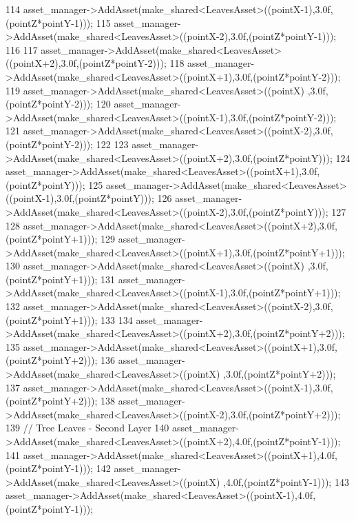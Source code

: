 \begin{DoxyCode}
114             asset\_manager->AddAsset(make\_shared<LeavesAsset>((pointX-1),3.0f,(pointZ*pointY-1)));
115             asset\_manager->AddAsset(make\_shared<LeavesAsset>((pointX-2),3.0f,(pointZ*pointY-1)));
116 
117             asset\_manager->AddAsset(make\_shared<LeavesAsset>((pointX+2),3.0f,(pointZ*pointY-2)));
118             asset\_manager->AddAsset(make\_shared<LeavesAsset>((pointX+1),3.0f,(pointZ*pointY-2)));
119             asset\_manager->AddAsset(make\_shared<LeavesAsset>((pointX)  ,3.0f,(pointZ*pointY-2)));
120             asset\_manager->AddAsset(make\_shared<LeavesAsset>((pointX-1),3.0f,(pointZ*pointY-2)));
121             asset\_manager->AddAsset(make\_shared<LeavesAsset>((pointX-2),3.0f,(pointZ*pointY-2)));
122 
123             asset\_manager->AddAsset(make\_shared<LeavesAsset>((pointX+2),3.0f,(pointZ*pointY)));
124             asset\_manager->AddAsset(make\_shared<LeavesAsset>((pointX+1),3.0f,(pointZ*pointY)));
125             asset\_manager->AddAsset(make\_shared<LeavesAsset>((pointX-1),3.0f,(pointZ*pointY)));
126             asset\_manager->AddAsset(make\_shared<LeavesAsset>((pointX-2),3.0f,(pointZ*pointY))); 
127 
128             asset\_manager->AddAsset(make\_shared<LeavesAsset>((pointX+2),3.0f,(pointZ*pointY+1)));
129             asset\_manager->AddAsset(make\_shared<LeavesAsset>((pointX+1),3.0f,(pointZ*pointY+1)));
130             asset\_manager->AddAsset(make\_shared<LeavesAsset>((pointX)  ,3.0f,(pointZ*pointY+1)));
131             asset\_manager->AddAsset(make\_shared<LeavesAsset>((pointX-1),3.0f,(pointZ*pointY+1)));
132             asset\_manager->AddAsset(make\_shared<LeavesAsset>((pointX-2),3.0f,(pointZ*pointY+1)));
133  
134             asset\_manager->AddAsset(make\_shared<LeavesAsset>((pointX+2),3.0f,(pointZ*pointY+2)));
135             asset\_manager->AddAsset(make\_shared<LeavesAsset>((pointX+1),3.0f,(pointZ*pointY+2)));
136             asset\_manager->AddAsset(make\_shared<LeavesAsset>((pointX)  ,3.0f,(pointZ*pointY+2)));
137             asset\_manager->AddAsset(make\_shared<LeavesAsset>((pointX-1),3.0f,(pointZ*pointY+2)));
138             asset\_manager->AddAsset(make\_shared<LeavesAsset>((pointX-2),3.0f,(pointZ*pointY+2)));
139             \textcolor{comment}{// Tree Leaves - Second Layer}
140             asset\_manager->AddAsset(make\_shared<LeavesAsset>((pointX+2),4.0f,(pointZ*pointY-1)));
141             asset\_manager->AddAsset(make\_shared<LeavesAsset>((pointX+1),4.0f,(pointZ*pointY-1)));
142             asset\_manager->AddAsset(make\_shared<LeavesAsset>((pointX)  ,4.0f,(pointZ*pointY-1)));
143             asset\_manager->AddAsset(make\_shared<LeavesAsset>((pointX-1),4.0f,(pointZ*pointY-1)));

\end{DoxyCode}

